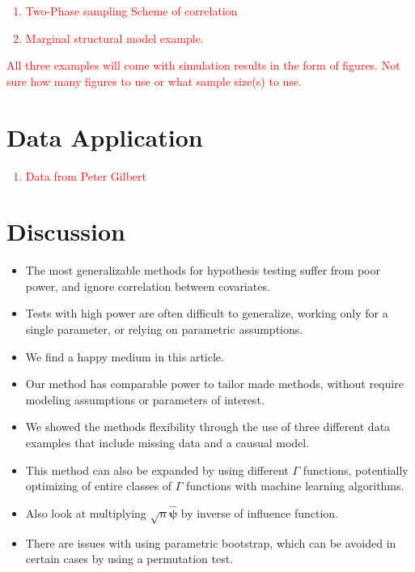 \documentclass{article}
\newcommand{\sh}{\textcolor{red}}
\begin{document}

\sh{
\begin{enumerate}
	\item Two-Phase sampling Scheme of correlation
	\item Marginal structural model example.
\end{enumerate}
All three examples will come with simulation results in the form of figures.  Not sure how many figures to use or what sample size(s) to use.
}

\section{Data Application}

\sh{\begin{enumerate}
	\item Data from Peter Gilbert
\end{enumerate}
}

\section{Discussion}
\begin{itemize}
	\item The most generalizable methods for hypothesis testing suffer from poor power, and ignore correlation between covariates.
	\item Tests with high power are often difficult to generalize, working only for a single parameter, or relying on parametric assumptions.
	\item We find a happy medium in this article.
	\item Our method has comparable power to tailor made methods, without require modeling assumptions or parameters of interest.
	\item We showed the methods flexibility through the use of three different data examples that include missing data and a causual model.
	\item This method can also be expanded by using different $\Gamma$ functions, potentially optimizing of entire classes of $\Gamma$ functions with machine learning algorithms.
	\item Also look at multiplying $\sqrt{n}\hat{\boldsymbol{\psi}}$ by inverse of influence function. 
	\item There are issues with using parametric bootstrap, which can be avoided in certain cases by using a permutation test.
\end{itemize}
\end{document}
